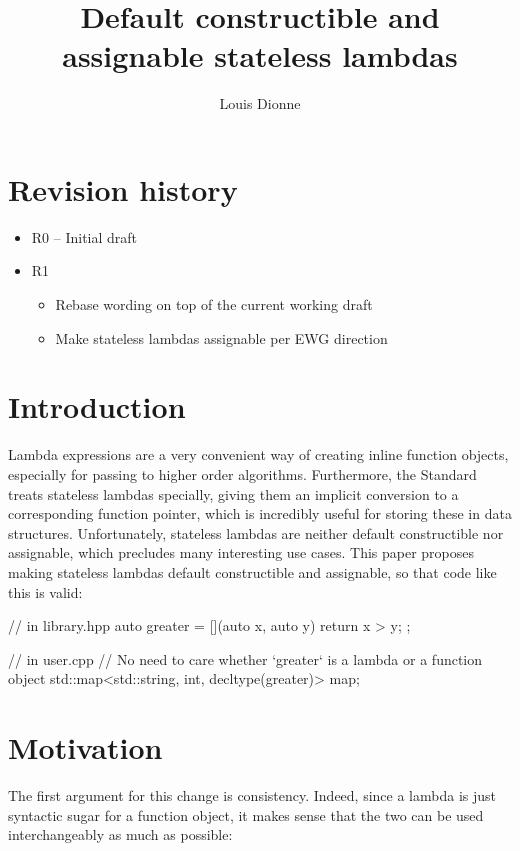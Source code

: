 \documentclass{wg21}
\title{Default constructible and assignable stateless lambdas}
\author{Louis Dionne}{ldionne.2@gmail.com}
\begin{document}
\maketitle

\section{Revision history}
\begin{itemize}
  \item R0 -- Initial draft
  \item R1 \begin{itemize}
             \item Rebase wording on top of the current working draft \cite{N4659}
             \item Make stateless lambdas assignable per EWG direction
           \end{itemize}
\end{itemize}


\section{Introduction}
Lambda expressions are a very convenient way of creating inline function objects,
especially for passing to higher order algorithms. Furthermore, the Standard
treats stateless lambdas specially, giving them an implicit conversion to a
corresponding function pointer, which is incredibly useful for storing these
in data structures. Unfortunately, stateless lambdas are neither default
constructible nor assignable, which precludes many interesting use cases.
This paper proposes making stateless lambdas default constructible and
assignable, so that code like this is valid:

\begin{cpp}
// in library.hpp
auto greater = [](auto x, auto y) { return x > y; };

// in user.cpp
// No need to care whether `greater` is a lambda or a function object
std::map<std::string, int, decltype(greater)> map;
\end{cpp}


\section{Motivation}
The first argument for this change is consistency. Indeed, since a lambda is
just syntactic sugar for a function object, it makes sense that the two can be
used interchangeably as much as possible:
\end{document}
